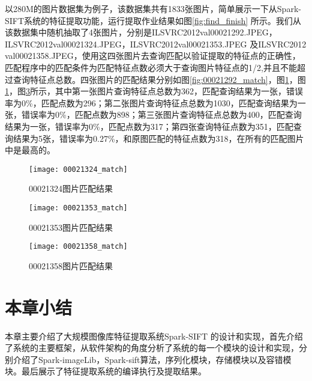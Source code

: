以280M的图片数据集为例子，该数据集共有1833张图片，简单展示一下从Spark-SIFT系统的特征提取功能，运行提取作业结果如图\ref{fig:find_finish} 所示。我们从该数据集中随机抽取了4张图片，分别是ILSVRC2012\textunderscore val\textunderscore00021292.JPEG，ILSVRC2012\textunderscore val\textunderscore00021324.JPEG，ILSVRC2012\textunderscore val\textunderscore00021353.JPEG 及ILSVRC2012\textunderscore\\val\textunderscore00021358.JPEG，使用这四张图片去查询匹配以验证提取的特征点的正确性，匹配程序中的匹配条件为匹配特征点数必须大于查询图片特征点的1/2,并且不能超过查询特征点总数。四张图片的匹配结果分别如图\ref{fig:00021292_match}，图\ref{fig:00021324_match}，图\ref{fig:00021324_match}，图\ref{fig:00021358_match}所示，其中第一张图片查询特征点总数为362，匹配查询结果为一张，错误率为0\%，匹配点数为296；第二张图片查询特征点总数为1030，匹配查询结果为一张，错误率为0\%，匹配点数为898；第三张图片查询特征点总数为400，匹配查询结果为一张，错误率为0\%，匹配点数为317；第四张查询特征点数为351，匹配查询结果为5张，错误率为0.27\%，和原图匹配的特征点数为318，在所有的匹配图片中是最高的。

\begin{figure}[htp]
\centering
\texttt{[image: 00021324\_match]}
\caption{00021324图片匹配结果}
\label{fig:00021324_match}
\end{figure}

\begin{figure}[htp]
\centering
\texttt{[image: 00021353\_match]}
\caption{00021353图片匹配结果}
\label{fig:00021353_match}
\end{figure}

\begin{figure}[htp]
\centering
\texttt{[image: 00021358\_match]}
\caption{00021358图片匹配结果}
\label{fig:00021358_match}
\end{figure}

\section{本章小结}
本章主要介绍了大规模图像库特征提取系统Spark-SIFT 的设计和实现，首先介绍了系统的主要框架，从软件架构的角度分析了系统的每一个模块的设计和实现，分别介绍了Spark-imageLib，Spark-sift算法，序列化模块，存储模块以及容错模块。最后展示了特征提取系统的编译执行及提取结果。
